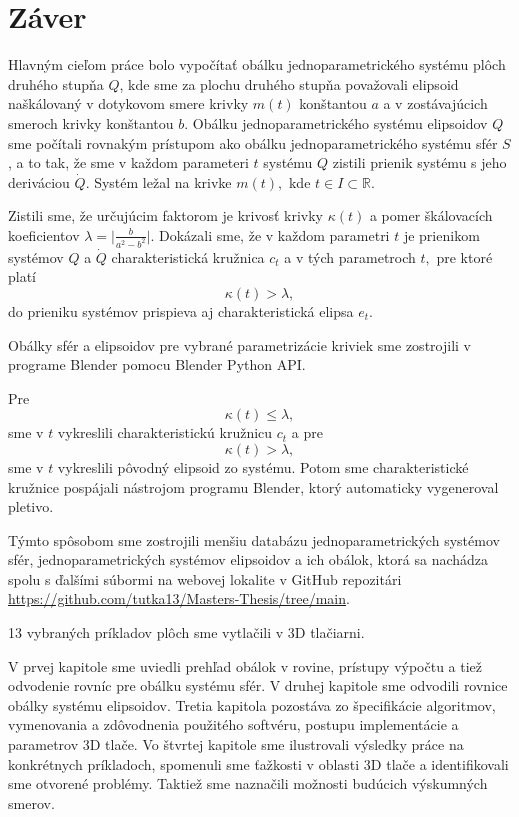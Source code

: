 \chapter*{Záver}
Hlavným cieľom práce bolo vypočítať obálku jednoparametrického systému plôch druhého stupňa $Q$, kde sme za plochu druhého stupňa považovali elipsoid naškálovaný v dotykovom smere krivky $m(t)$ konštantou $a$ a v zostávajúcich smeroch krivky konštantou $b$. Obálku jednoparametrického systému elipsoidov $Q$ sme počítali rovnakým prístupom ako obálku jednoparametrického systému sfér $S$, a to tak, že sme v každom parameteri $t$ systému $Q$ zistili prienik systému s jeho deriváciou $\dot{Q}$. Systém ležal na krivke $m(t),$ kde $t \in I \subset \mathbb{R}.$

Zistili sme, že určujúcim faktorom je krivosť krivky $\kappa(t)$ a pomer škálovacích koeficientov $\lambda = \big| \frac{b}{a^2 - b^2} \big|.$ Dokázali sme, že v každom parametri $t$ je prienikom systémov $Q$ a $\dot{Q}$ charakteristická kružnica $c_t$ a v tých parametroch $t,$ pre ktoré platí
$$
\kappa(t) > \lambda,
$$  
do prieniku systémov prispieva aj charakteristická elipsa $e_t$.

Obálky sfér a elipsoidov pre vybrané parametrizácie kriviek sme zostrojili v programe Blender pomocu Blender Python API. 

Pre 
$$
\kappa(t) \leq \lambda,
$$  
sme v $t$ vykreslili charakteristickú kružnicu $c_t$ a pre
$$
\kappa(t) > \lambda,
$$  
sme v $t$ vykreslili pôvodný elipsoid zo systému.
Potom sme charakteristické kružnice pospájali nástrojom programu Blender, ktorý automaticky vygeneroval pletivo. 

Týmto spôsobom sme zostrojili menšiu databázu jednoparametrických systémov sfér, jednoparametrických systémov elipsoidov a ich obálok, ktorá sa nachádza spolu s ďalšími súbormi na webovej lokalite v GitHub repozitári \url{https://github.com/tutka13/Masters-Thesis/tree/main}. 

13 vybraných príkladov plôch sme vytlačili v 3D tlačiarni.

V prvej kapitole sme uviedli prehľad obálok v rovine, prístupy výpočtu a tiež odvodenie rovníc pre obálku systému sfér. V druhej kapitole sme odvodili rovnice obálky systému elipsoidov. Tretia kapitola pozostáva zo špecifikácie algoritmov, vymenovania a zdôvodnenia použitého softvéru, postupu implementácie a parametrov 3D tlače. Vo štvrtej kapitole sme ilustrovali výsledky práce na konkrétnych príkladoch, spomenuli sme ťažkosti v oblasti 3D tlače a identifikovali sme otvorené problémy. Taktiež sme naznačili možnosti budúcich výskumných smerov.